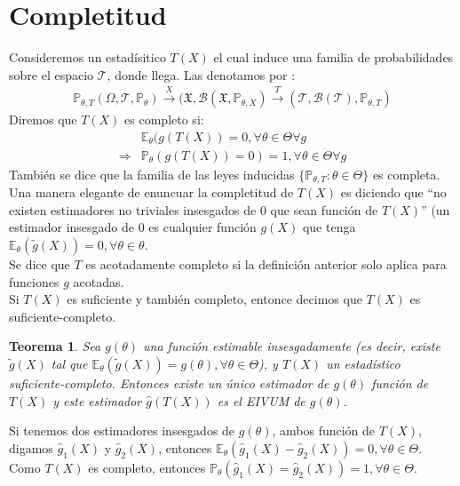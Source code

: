 \documentclass[10pt]{article}
\theoremstyle{plain}
\newtheorem{teo}{Teorema}
\theoremstyle{definition}
\begin{document}
\section{Completitud}
Consideremos un estadísitico $T(X)$ el cual induce una familia de probabilidades sobre el espacio $\mathscr{T}$, donde llega. Las denotamos por :
\begin{align*}
\mathbb{P}_{\theta, T} (\Omega, \mathcal{T}, \mathbb{P}_{\theta}) \xrightarrow{X} (\mathfrak{X}, \mathcal{B}(\mathfrak{X}, \mathbb{P}_{\theta,X}) \xrightarrow{T} (\mathscr{T}, \mathcal{B}(\mathscr{T}), \mathbb{P}_{\theta, T})
\end{align*}
Diremos que $T(X)$ es completo si:
\begin{align*}
&\mathbb{E}_{\theta}(g(T(X)) =0, \forall \theta \in \Theta \forall g\\
\Rightarrow & \mathbb{P}_{\theta}(g(T(X))=0) = 1, \forall \theta \in \Theta \forall g
\end{align*}
También se dice que la familia de las leyes inducidas $\{\mathbb{P}_{\theta,T}\colon \theta \in \Theta\}$ es completa.\\

Una manera elegante de enuncuar la completitud de $T(X)$ es diciendo que ``no existen estimadores no triviales insesgados de 0 que sean función de $T(X)$'' (un estimador insesgado de 0 es cualquier función $g(X)$ que tenga $\mathbb{E}_{\theta}(\tilde{g}(X))=0, \forall \theta \in \theta$.\\

Se dice que $T$ es acotadamente completo si la definición anterior solo aplica para funciones $g$ acotadas.\\
Si $T(X)$ es suficiente y también completo, entonce decimos que $T(X)$ es suficiente-completo.

\begin{teo} Sea $g(\theta)$ una función estimable insesgadamente (es decir, existe $\tilde{g}(X)$ tal que $\mathbb{E}_{\theta}(\tilde{g}(X))=g(\theta), \forall \theta \in \Theta$), y $T(X)$ un estadístico suficiente-completo. Entonces existe un único estimador de $g(\theta)$ función de $T(X)$ y este estimador $\hat{g}(T(X))$ es el EIVUM de $g(\theta)$.\\
\end{teo}
Si tenemos dos estimadores insesgados de $g(\theta)$, ambos función de $T(X)$, digamos $\hat{g}_{1}(X)$ y $\hat{g}_{2}(X)$, entonces $\mathbb{E}_{\theta}(\hat{g}_{1}(X)-\hat{g}_{2}(X)) = 0, \forall \theta \in \Theta$. Como  $T(X)$ es completo, entonces  $\mathbb{P}_{\theta}(\hat{g}_{1}(X) = \hat{g}_{2}(X)) = 1, \forall \theta \in \Theta$.\\
\end{document}

